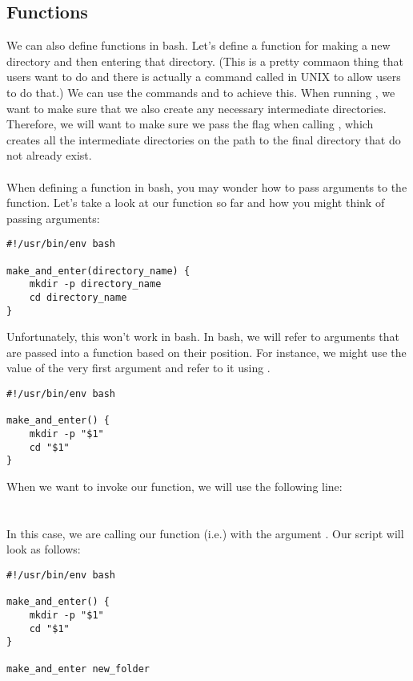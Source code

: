 \documentclass{article}
\begin{document}
\subsection{Functions}
We can also define functions in bash. Let's define a function for making a new directory and then entering that directory. (This is a pretty commaon thing that users want to do and there is actually a command called  in UNIX to allow users to do that.) We can use the commands  and  to achieve this. When running , we want to make sure that we also create any necessary intermediate directories. Therefore, we will want to make sure we pass the  flag when calling , which creates all the intermediate directories on the path to the final directory that do not already exist.
\\
\\ When defining a function in bash, you may wonder how to pass arguments to the function. Let's take a look at our function so far and how you might think of passing arguments:  
\begin{lstlisting}[style=Python]
#!/usr/bin/env bash

make_and_enter(directory_name) {
	mkdir -p directory_name
	cd directory_name
}
\end{lstlisting}
Unfortunately, this won't work in bash. In bash, we will refer to arguments that are passed into a function based on their position. For instance, we might use the value of the very first argument and refer to it using .

\begin{lstlisting}[style=Python]
#!/usr/bin/env bash

make_and_enter() {
	mkdir -p "$1"
	cd "$1"
}
\end{lstlisting}
When we want to invoke our function, we will use the following line:
\\  
\\
\\ In this case, we are calling our function (i.e.) with the argument . Our script will look as follows: 
\begin{lstlisting}[style=Python]
#!/usr/bin/env bash

make_and_enter() {
	mkdir -p "$1"
	cd "$1"
}

make_and_enter new_folder
\end{lstlisting}
\end{document}
